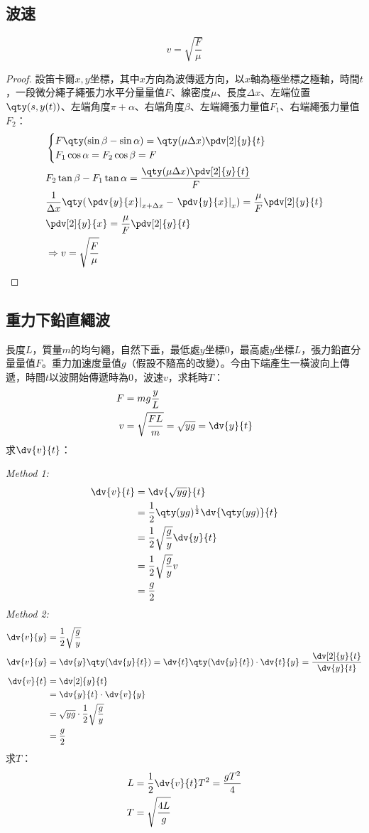 \documentclass[a4paper,12pt]{report}
\begin{document}
\subsection{波速}
\[v=\sqrt{\frac{F}{\mu}}\]
\begin{proof}
設笛卡爾$x,y$坐標，其中$x$方向為波傳遞方向，以$x$軸為極坐標之極軸，時間$t$，一段微分繩子繩張力水平分量量值$F$、線密度$\mu$、長度$\Delta x$、左端位置$\qty(s,y(t))$、左端角度$\pi+\alpha$、右端角度$\beta$、左端繩張力量值$F_1$、右端繩張力量值$F_2$：
\[\begin{aligned}
&\begin{cases}
F\qty(\sin\beta-\sin\alpha)=\qty(\mu\Delta x)\pdv[2]{y}{t}\\
F_1\cos\alpha=F_2\cos\beta=F
\end{cases}\\
& F_2\tan\beta-F_1\tan\alpha=\frac{\qty(\mu\Delta x)\pdv[2]{y}{t}}{F}\\
& \frac{1}{\Delta x}\qty(\left.\pdv{y}{x}\right|_{x+\Delta x}-\left.\pdv{y}{x}\right|_x)=\frac{\mu}{F}\pdv[2]{y}{t}\\
& \pdv[2]{y}{x}=\frac{\mu}{F}\pdv[2]{y}{t}\\
& \Rightarrow v=\sqrt{\frac{F}{\mu}}
\end{aligned}\]
\end{proof}
\subsection{重力下鉛直繩波}
長度$L$，質量$m$的均勻繩，自然下垂，最低處$y$坐標$0$，最高處$y$坐標$L$，張力鉛直分量量值$F$。重力加速度量值$g$（假設不隨高的改變）。今由下端產生一橫波向上傳遞，時間$t$以波開始傳遞時為0，波速$v$，求耗時$T$：
\[\begin{aligned}
F &= mg\frac{y}{L}\\
v &= \sqrt{\frac{FL}{m}}=\sqrt{yg}=\dv{y}{t}
\end{aligned}\]
求$\dv{v}{t}$：

\textit{Method 1:}
\[\begin{aligned}
\dv{v}{t} &= \dv{\sqrt{yg}}{t}\\
&= \frac{1}{2}\qty(yg)^\frac{1}{2}\dv{\qty(yg)}{t}\\
&= \frac{1}{2}\sqrt{\frac{g}{y}}\dv{y}{t}\\
&= \frac{1}{2}\sqrt{\frac{g}{y}}v\\
&= \frac{g}{2}\\
\end{aligned}\]
\textit{Method 2:}
\[\begin{aligned}
\dv{v}{y} &= \frac{1}{2}\sqrt{\frac{g}{y}}\\
\dv{v}{y} &= \dv{y}\qty(\dv{y}{t})=\dv{t}\qty(\dv{y}{t})\cdot\dv{t}{y}=\frac{\dv[2]{y}{t}}{\dv{y}{t}}\\
\dv{v}{t} &= \dv[2]{y}{t} \\
&= \dv{y}{t}\cdot\dv{v}{y} \\
&= \sqrt{yg}\cdot\frac{1}{2}\sqrt{\frac{g}{y}}\\
&= \frac{g}{2}
\end{aligned}\]
求$T$：
\[\begin{aligned}
L &= \frac{1}{2}\dv{v}{t}T^2 = \frac{gT^2}{4}\\
T &= \sqrt{\frac{4L}{g}}
\end{aligned}\]
\end{document}
